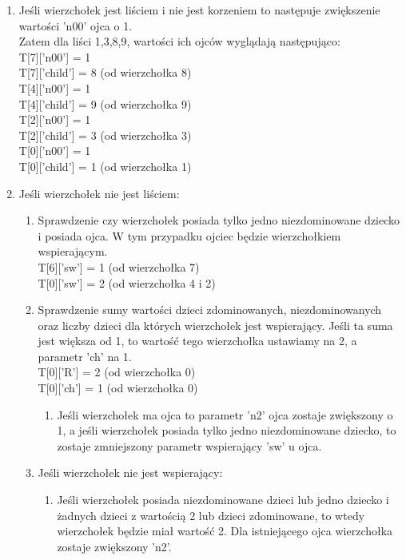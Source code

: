\begin{enumerate}
    \item Jeśli wierzchołek jest liściem i nie jest korzeniem to następuje zwiększenie wartości 'n00' ojca o 1.\\
    Zatem dla liści 1,3,8,9, wartości ich ojców wyglądają następująco:\\
        T[7]['n00'] = 1  \\
        T[7]['child'] = 8  (od wierzchołka 8)\\
        T[4]['n00'] = 1 \\
        T[4]['child'] = 9  (od wierzchołka 9)\\
        T[2]['n00'] = 1  \\
        T[2]['child'] = 3  (od wierzchołka 3)\\
        T[0]['n00'] = 1 \\
        T[0]['child'] = 1  (od wierzchołka 1)
    \item Jeśli wierzchołek nie jest liściem:
    \begin{enumerate}
        \item Sprawdzenie czy wierzchołek posiada tylko jedno niezdominowane dziecko i posiada ojca. W tym przypadku ojciec będzie wierzchołkiem wspierającym. \\
        T[6]['sw'] = 1 (od wierzchołka 7)\\
        T[0]['sw'] = 2 (od wierzchołka 4 i 2)
        \item Sprawdzenie sumy wartości dzieci zdominowanych, niezdominowanych oraz liczby dzieci dla których wierzchołek jest wspierający. Jeśli ta suma jest większa od 1, to wartość tego wierzchołka ustawiamy na 2, a parametr 'ch' na 1.\\
        T[0]['R'] = 2  (od wierzchołka 0)\\
        T[0]['ch'] = 1  (od wierzchołka 0)
        \begin{enumerate}
            \item Jeśli wierzchołek ma ojca to parametr 'n2' ojca zostaje zwiększony  o 1, a jeśli wierzchołek posiada tylko jedno niezdominowane dziecko, to zostaje zmniejszony parametr wspierający 'sw' u ojca.
        \end{enumerate}
        \item Jeśli wierzchołek nie jest wspierający:
            \begin{enumerate}
                \item Jeśli wierzchołek posiada niezdominowane dzieci lub jedno dziecko i żadnych dzieci z wartością 2 lub dzieci zdominowane, to wtedy wierzchołek będzie miał wartość 2. Dla istniejącego ojca wierzchołka zostaje zwiększony 'n2'.\\

\end{enumerate}
\end{enumerate}
\end{enumerate}
